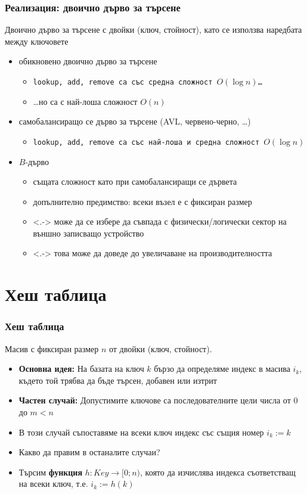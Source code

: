\documentclass[alsotrans]{beamerswitch}
\begin{document}
\begin{frame}
  \frametitle{Реализация: двоично дърво за търсене}
  Двоично дърво за търсене с двойки (ключ, стойност), като се използва наредбата между ключовете
  \pause
  \begin{itemize}[<+->]
  \item обикновено двоично дърво за търсене
    \begin{itemize}
    \item \tt{lookup}, \tt{add}, \tt{remove} са със средна сложност $O(\log n)$\ldots
    \item \ldots но са с най-лоша сложност $O(n)$
    \end{itemize}
  \item самобалансиращо се дърво за търсене (AVL, червено-черно, \ldots)
    \begin{itemize}
    \item \tt{lookup}, \tt{add}, \tt{remove} са със най-лоша и средна сложност \alert{$O(\log n)$}
    \end{itemize}
  \item $B$-дърво
    \begin{itemize}
    \item същата сложност като при самобалансиращи се дървета
    \item допълнително предимство: всеки възел е с фиксиран размер
    \item<.-> може да се избере да съвпада с физически/логически сектор на външно записващо устройство
    \item<.-> това може да доведе до увеличаване на производителността
    \end{itemize}
  \end{itemize}
\end{frame}

\section{Хеш таблица}

\begin{frame}
  \frametitle{Хеш таблица}
  Масив с фиксиран размер $n$ от двойки (ключ, стойност).
  \begin{itemize}[<+->]
  \item \textbf{Основна идея:} На базата на ключ $k$ бързо да определяме индекс в масива $i_k$, където той трябва да бъде търсен, добавен или изтрит
  \item \textbf{Частен случай:} Допустимите ключове са последователните цели числа от 0 до $m < n$
  \item В този случай съпоставяме на всеки ключ индекс със същия номер $i_k := k$
  \item Какво да правим в останалите случаи?
  \item Търсим \textbf{функция} $h : Key \rightarrow [0; n)$, която да изчислява индекса съответстващ на всеки ключ, т.е. $i_k := h(k)$
  \end{itemize}
\end{frame}
\end{document}
